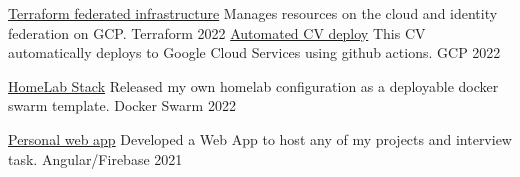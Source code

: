 

\begin{cvhonors}

  \cvhonor
  {\href{https://github.com/FarDust/terraform-infrastructure}{Terraform federated infrastructure}} %
  {Manages resources on the cloud and identity federation on GCP.}
  {Terraform} %
  {2022} %
  \cvhonor
  {\href{https://github.com/FarDust/curriculum-vitae}{Automated CV deploy}}
  {This CV automatically deploys to Google Cloud Services using github actions.}
  {GCP} %
  {2022} %

  \cvhonor
  {\href{https://github.com/FarDust/homelab-stack}{HomeLab Stack}}
  {Released my own homelab configuration as a deployable docker swarm template.}
  {Docker Swarm} %
  {2022} %

  \cvhonor
  {\href{https://github.com/FarDust/fardust-web}{Personal web app}}
  {Developed a Web App to host any of my projects and interview task.}
  {Angular/Firebase} %
  {2021} %

\end{cvhonors}
